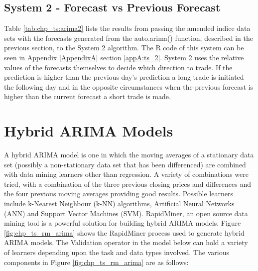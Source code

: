 

\subsection{System 2 - Forecast vs Previous Forecast}
Table \ref{tab:chp_ts:arima2} lists the results from passing the amended indice data sets with the forecasts generated from the auto.arima() function, described in the previous section, to the System 2 algorithm. The R code of this system can be seen in  Appendix \ref{AppendixA} section \ref{appA:ts_2}. System 2 uses the relative values of the forecasts themselves to decide which direction to trade. If the prediction is higher than the previous day's prediction a long trade is initiated the following day and in the opposite circumstances when the previous forecast is higher than the current forecast a short trade is made.


\section{Hybrid ARIMA Models}
\label{sec:arima:chp5}
A hybrid ARIMA model is one in which the moving averages of a stationary data set (possibly a non-stationary data set that has been differenced) are combined with data mining learners other than regression. A variety of combinations were tried, with a combination of the three previous closing prices and differences and the four previous moving averages providing good results. Possible learners include k-Nearest Neighbour (k-NN) algorithms, Artificial Neural Networks (ANN) and Support Vector Machines (SVM).  RapidMiner, an open source data mining tool is a powerful solution for building hybrid ARIMA models. Figure \ref{fig:chp_ts_rm_arima} shows the RapidMiner process used to generate hybrid ARIMA models. The Validation operator in the model below can hold a variety of learners depending upon the task and data types involved. The various components in Figure \ref{fig:chp_ts_rm_arima} are as follows:


